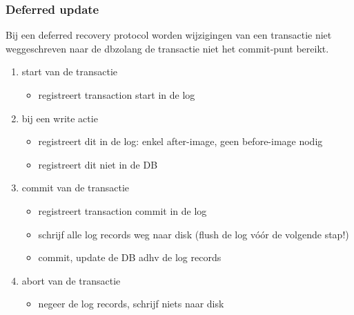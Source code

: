 \documentclass[a4paper,12pt]{article}
\begin{document}
\subsubsection{Deferred update}
Bij een deferred recovery protocol worden wijzigingen van een transactie niet weggeschreven naar de dbzolang de transactie niet het commit-punt bereikt.
\begin{enumerate}
\item start van de transactie
	\begin{itemize}
	\item registreert transaction start in de log
	\end{itemize}
\item bij een write actie
	\begin{itemize}
	\item registreert dit in de log: enkel after-image, geen before-image nodig
	\item registreert dit niet in de DB
	\end{itemize}
\item commit van de transactie
	\begin{itemize}
	\item registreert transaction commit in de log
	\item schrijf alle log records weg naar disk (flush de log vóór de volgende stap!)
	\item commit, update de DB adhv de log records
	\end{itemize}
\item abort van de transactie
	\begin{itemize}
	\item negeer de log records, schrijf niets naar disk
	\end{itemize}
\end{enumerate}
\end{document}
